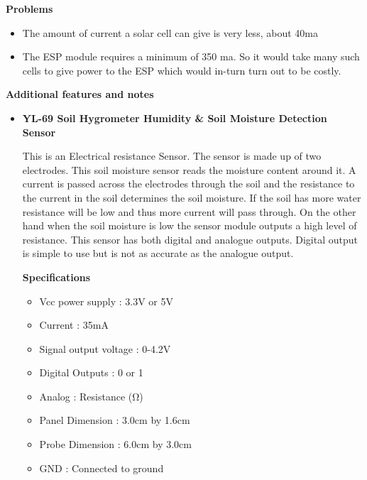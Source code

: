 \documentclass[16pt]{article}
\begin{document}
\textbf{Problems}

\begin{itemize}

\item
  The amount of current a solar cell can give is very less, about 40ma
\item
  The ESP module requires a minimum of 350 ma. So it would take many
  such cells to give power to the ESP which would in-turn turn out to be
  costly.
\end{itemize}

\vspace{9.5cm}
{\LARGE{\textbf{Additional features and notes}}}

\vspace{0.5cm}

\begin{itemize}

\item{\textbf{YL-69 Soil Hygrometer Humidity \& Soil Moisture Detection Sensor}}


\vspace{0.3cm}
This is an Electrical resistance Sensor. The sensor is made up of two
electrodes. This soil moisture sensor reads the moisture content around
it. A current is passed across the electrodes through the soil and the
resistance to the current in the soil determines the soil moisture. If
the soil has more water resistance will be low and thus more current
will pass through. On the other hand when the soil moisture is low the
sensor module outputs a high level of resistance. This sensor has both
digital and analogue outputs. Digital output is simple to use but is not
as accurate as the analogue output.

\vspace{0.5cm}

{\Large{\textbf{Specifications}}}

\begin{itemize}

\item
  Vcc power supply : 3.3V or 5V
\item
  Current : 35mA
\item
  Signal output voltage : 0-4.2V
\item
  Digital Outputs : 0 or 1
\item
  Analog : Resistance (Ω)
\item
  Panel Dimension : 3.0cm by 1.6cm
\item
  Probe Dimension : 6.0cm by 3.0cm
\item
  GND : Connected to ground
\end{itemize}


\end{itemize}
\end{document}
